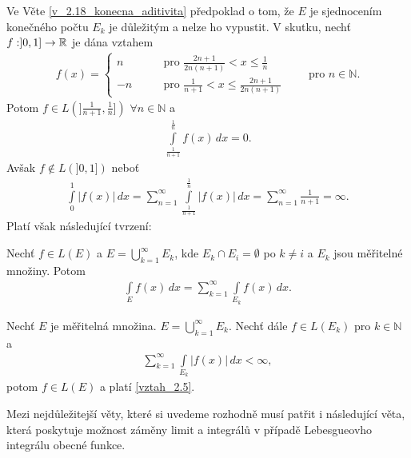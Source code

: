 \begin{poznamka}
Ve Věte \ref{v_2.18_konecna_aditivita} předpoklad o tom, že $E$ je sjednocením konečného počtu $E_k$ je důležitým a nelze ho vypustit. V skutku, nechť $f:]0,1] \to \mathbb{R}$ je dána vztahem
\begin{align*}
f(x) = \begin{cases}
n \qquad &\text{pro $\frac{2n+1}{2n(n+1)} < x \leq \frac{1}{n} $}\\
-n \qquad &\text{pro $\frac{1}{n+1} < x \leq \frac{2n+1}{2n(n+1)} $}
\end{cases}
\qquad \text{pro $n \in \mathbb{N}$.}
\end{align*}
Potom $f \in L(]\frac{1}{n+1}, \frac{1}{n}])$ $\forall n \in \mathbb{N}$ a 
\begin{align*}
\int \limits _{\frac{1}{n+1}}^{\frac{1}{n}} f(x) \, dx = 0.
\end{align*}
Avšak $f \notin L(]0,1])$ neboť
\begin{align*}
\int \limits _{0}^1 |f(x)| \, dx = \sum \limits _{n=1}^{\infty} \int \limits _{\frac{1}{n+1}}^{\frac{1}{n}} |f(x)| \, dx = \sum \limits _{n=1}^{\infty} \frac{1}{n+1} = \infty.
\end{align*}
Platí však následující tvrzení:
\end{poznamka}


\begin{theorem}
Nechť $f \in L(E)$ a $E=\bigcup \limits _{k=1}^{\infty} E_k$, kde $E_k \cap E_i = \emptyset$ po $k \neq i$ a $E_k$ jsou měřitelné množiny. Potom
\begin{align}
\int \limits _{E} f(x) \, dx = \sum \limits _{k=1}^{\infty} \int \limits _{E_k} f(x) \, dx.
\label{vztah_2.5}
\end{align}
\end{theorem}

\begin{theorem}
Nechť $E$ je měřitelná množina. $E=\bigcup \limits _{k=1}^{\infty}E_k$. Nechť dále $f \in L(E_k)$ pro $k \in \mathbb{N}$ a 
\begin{align*}
\sum \limits _{k=1}^{\infty} \int \limits  _{E_k} |f(x)| \,dx < \infty,
\end{align*}
potom $f \in L(E)$ a platí \eqref{vztah_2.5}.
\end{theorem}

Mezi nejd\r uležitejší věty, které si uvedeme rozhodně musí patřit i následující věta, která poskytuje možnost záměny limit a integrál\r u v případě Lebesgueovho integrálu obecné funkce.

